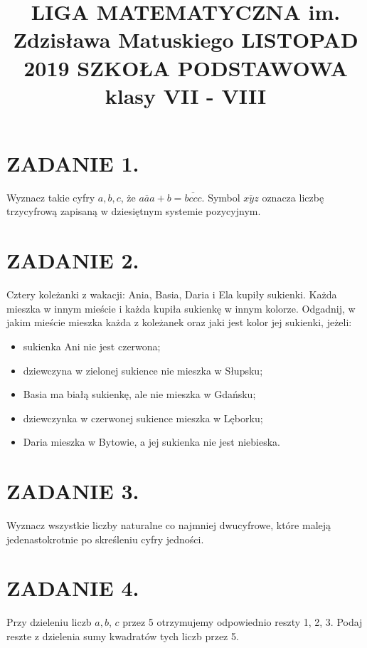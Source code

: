 \documentclass[10pt]{article}
\title{LIGA MATEMATYCZNA im. Zdzisława Matuskiego LISTOPAD 2019 SZKOŁA PODSTAWOWA klasy VII - VIII }
\author{}
\date{}
\begin{document}
\maketitle
\section*{ZADANIE 1.}
Wyznacz takie cyfry \(a, b, c\), że \(\overline{a a a}+b=\overline{b c c c}\). Symbol \(\overline{x y z}\) oznacza liczbę trzycyfrową zapisaną w dziesiętnym systemie pozycyjnym.

\section*{ZADANIE 2.}
Cztery koleżanki z wakacji: Ania, Basia, Daria i Ela kupiły sukienki. Każda mieszka w innym mieście i każda kupiła sukienkę w innym kolorze. Odgadnij, w jakim mieście mieszka każda z koleżanek oraz jaki jest kolor jej sukienki, jeżeli:

\begin{itemize}
  \item sukienka Ani nie jest czerwona;
  \item dziewczyna w zielonej sukience nie mieszka w Słupsku;
  \item Basia ma białą sukienkę, ale nie mieszka w Gdańsku;
  \item dziewczynka w czerwonej sukience mieszka w Lęborku;
  \item Daria mieszka w Bytowie, a jej sukienka nie jest niebieska.
\end{itemize}

\section*{ZADANIE 3.}
Wyznacz wszystkie liczby naturalne co najmniej dwucyfrowe, które maleją jedenastokrotnie po skreśleniu cyfry jedności.

\section*{ZADANIE 4.}
Przy dzieleniu liczb \(a, b\), \(c\) przez 5 otrzymujemy odpowiednio reszty 1, 2, 3. Podaj reszte z dzielenia sumy kwadratów tych liczb przez 5.
\end{document}

